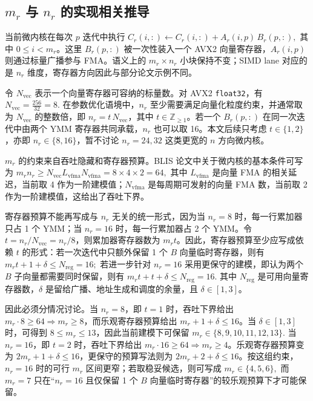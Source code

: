 \documentclass[a4paper,11pt,oneside]{article}
\begin{document}
\subsection{$m_r$ 与 $n_r$ 的实现相关推导}

当前微内核在每次 $p$ 迭代中执行
$
C_r(i,:) \leftarrow C_r(i,:) + A_r(i,p)\,B_r(p,:),
$
其中 $0 \le i < m_r$。这里 $B_r(p,:)$ 被一次性装入一个 AVX2 向量寄存器，$A_r(i,p)$ 则通过标量广播参与 FMA。语义上的 $m_r \times n_r$ 小块保持不变；SIMD lane 对应的是 $n_r$ 维度，寄存器方向因此与部分论文示例不同。

令 $N_{\text{vec}}$ 表示一个向量寄存器可容纳的标量数。对 AVX2 \texttt{float32}，有
$
N_{\text{vec}} = \frac{256}{32} = 8.
$
在参数优化语境中，$n_r$ 至少需要满足向量化粒度约束，并通常取为 $N_{\text{vec}}$ 的整数倍，即 $n_r = t\,N_{\text{vec}}$，其中 $t \in \mathbb{Z}_{\ge 1}$。若一个 $B_r(p,:)$ 在同一次迭代中由两个 YMM 寄存器共同承载，$n_r$ 也可以取 16。本文后续只考虑 $t \in \{1,2\}$，亦即 $n_r \in \{8,16\}$，暂不讨论 $n_r = 24,32$ 这类更宽的 $n$ 方向微内核。

$m_r$ 的约束来自吞吐隐藏和寄存器预算。BLIS 论文中关于微内核的基本条件可写为
$
m_r n_r \ge N_{\text{vec}} L_{\text{vfma}} N_{\text{vfma}} = 8 \times 4 \times 2 = 64,
$
其中 $L_{\text{vfma}}$ 是向量 FMA 的相关延迟，当前取 4 作为一阶建模值；$N_{\text{vfma}}$ 是每周期可发射的向量 FMA 数，当前取 2 作为一阶建模值，这给出了吞吐下界。

寄存器预算不能再写成与 $n_r$ 无关的统一形式，因为当 $n_r = 8$ 时，每一行累加器只占 1 个 YMM；当 $n_r = 16$ 时，每一行累加器占 2 个 YMM。令 $t = n_r / N_{\text{vec}} = n_r / 8$，则累加器寄存器数为 $m_r t$。因此，寄存器预算至少应写成依赖 $t$ 的形式：若一次迭代中只额外保留 1 个 $B$ 向量临时寄存器，则有
$
m_r t + 1 + \delta \le N_{\text{reg}} = 16;
$
若进一步针对 $n_r = 16$ 采用更保守的建模，即认为两个 $B$ 子向量都需要同时保留，则有
$
m_r t + t + \delta \le N_{\text{reg}} = 16.
$
其中 $N_{\text{reg}}$ 是可用向量寄存器数，$\delta$ 是留给广播、地址生成和调度的余量，且 $\delta \in [1,3]$。

因此必须分情况讨论。当 $n_r = 8$，即 $t = 1$ 时，吞吐下界给出 $m_r \cdot 8 \ge 64 \Rightarrow m_r \ge 8$，而乐观寄存器预算给出 $m_r + 1 + \delta \le 16$。当 $\delta \in [1,3]$ 时，可得到 $8 \le m_r \le 13$，因此当前建模下可保留
$
m_r \in \{8,9,10,11,12,13\}.
$
当 $n_r = 16$，即 $t = 2$ 时，吞吐下界给出 $m_r \cdot 16 \ge 64 \Rightarrow m_r \ge 4$。乐观寄存器预算变为 $2m_r + 1 + \delta \le 16$，更保守的预算写法则为 $2m_r + 2 + \delta \le 16$。按这组约束，$n_r = 16$ 时的可行 $m_r$ 区间更窄；若取稳妥候选，则可写成
$
m_r \in \{4,5,6\},
$
而 $m_r = 7$ 只在“$n_r = 16$ 且仅保留 1 个 $B$ 向量临时寄存器”的较乐观预算下才可能保留。
\end{document}
